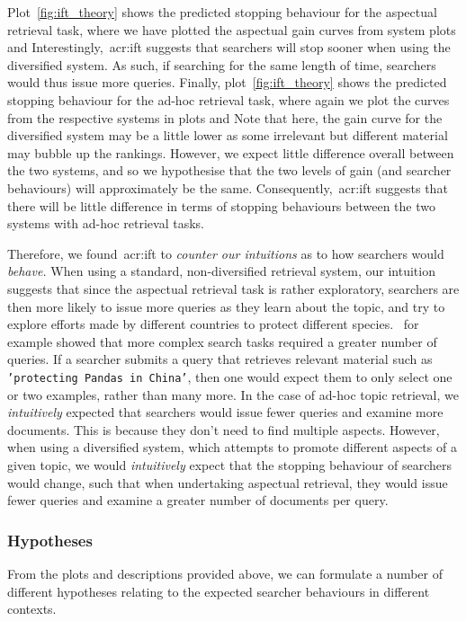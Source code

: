 Plot~\ref{fig:ift_theory}  shows the predicted stopping behaviour for the aspectual retrieval task, where we have plotted the aspectual gain curves from system plots  and  Interestingly,~\gls{acr:ift} suggests that searchers will stop sooner when using the diversified system. As such, if searching for the same length of time, searchers would thus issue more queries. Finally, plot~\ref{fig:ift_theory}  shows the predicted stopping behaviour for the ad-hoc retrieval task, where again we plot the curves from the respective systems in plots  and  Note that here, the gain curve for the diversified system may be a little lower as some irrelevant but different material may bubble up the rankings. However, we expect little difference overall between the two systems, and so we hypothesise that the two levels of gain (and searcher behaviours) will approximately be the same. Consequently,~\gls{acr:ift} suggests that there will be little difference in terms of stopping behaviours between the two systems with ad-hoc retrieval tasks.

Therefore, we found~\gls{acr:ift} to \emph{counter our intuitions} as to how searchers would \emph{behave.} When using a standard, non-diversified retrieval system, our intuition suggests that since the aspectual retrieval task is rather exploratory, searchers are then more likely to issue more queries as they learn about the topic, and try to explore efforts made by different countries to protect different species.~\cite{kelly2015search_tasks} for example showed that more complex search tasks required a greater number of queries. If a searcher submits a query that retrieves relevant material such as \texttt{'protecting Pandas in China'}, then one would expect them to only select one or two examples, rather than many more. In the case of ad-hoc topic retrieval, we \emph{intuitively} expected that searchers would issue fewer queries and examine more documents. This is because they don't need to find multiple aspects. However, when using a diversified system, which attempts to promote different aspects of a given topic, we would \emph{intuitively} expect that the stopping behaviour of searchers would change, such that when undertaking aspectual retrieval, they would issue fewer queries and examine a greater number of documents per query.

\subsubsection{Hypotheses}\label{sec:diversity:background:tasks:hypotheses}
From the plots and descriptions provided above, we can formulate a number of different hypotheses relating to the expected searcher behaviours in different contexts.

